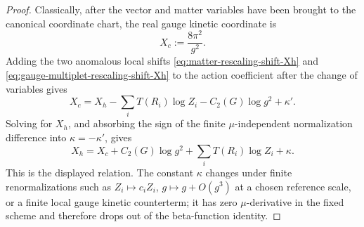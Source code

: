 \begin{proof}
Classically, after the vector and matter variables have been brought to the
canonical coordinate chart, the real gauge kinetic coordinate is
\[
  X_c:=\frac{8\pi^2}{g^2}.
\]
Adding the two anomalous local shifts
\eqref{eq:matter-rescaling-shift-Xh} and
\eqref{eq:gauge-multiplet-rescaling-shift-Xh} to the action coefficient after
the change of variables gives
\[
  X_c
  =
  X_h
  -
  \sum_iT(R_i)\log Z_i
  -
  C_2(G)\log g^2
  +
  \kappa' .
\]
Solving for \(X_h\), and absorbing the sign of the finite
\(\mu\)-independent normalization difference into
\(\kappa=-\kappa'\), gives
\[
  X_h
  =
  X_c
  +
  C_2(G)\log g^2
  +
  \sum_iT(R_i)\log Z_i
  +
  \kappa .
  \]
This is the displayed relation.  The constant \(\kappa\) changes under finite
renormalizations such as \(Z_i\mapsto c_iZ_i\), \(g\mapsto g+O(g^3)\) at a
chosen reference scale, or a finite local gauge kinetic counterterm; it has
zero \(\mu\)-derivative in the fixed scheme and therefore drops out of the
beta-function identity.
\end{proof}

